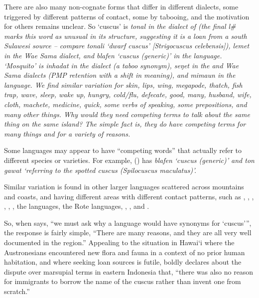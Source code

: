 There are also many non-cognate forms that differ in different
dialects, some triggered by different patterns of contact,
some by tabooing, and the motivation for others remains unclear.
So ‘cuscus’ is \it{tonal} in the  dialect of  (the
final \it{l{\#}} marks this word as unusual in its structure,
suggesting it is a loan from a south Sulawesi source -- compare
 \it{tonali} ‘dwarf cuscus’ [\it{Strigocuscus celebensis}]),
\it{lemet} in the Wae Sama dialect,
and \it{blafen} ‘cuscus (generic)’
in the  language.
‘Mosquito’ is \it{inhadat} in the  dialect (a taboo synonym),
\it{seŋet} in the 
and Wae Sama dialects (PMP retention with a shift in meaning),
and \it{mimaun} in the  language.
We find similar variation for skin,
lips, wing, megapode, thatch,
fish trap, wave, sleep, wake up, hungry,
cold/flu, defecate, good, many,
husband, wife, cloth, machete,
medicine, quick, some verbs of speaking,
some prepositions, and many other things.
Why would they need competing terms to talk about the same thing
on the same island? The simple fact is,
they do have competing terms for many things
and for a variety of reasons.

Some languages may appear to have ``competing words'' that actually
refer to different species or varieties.
For example,  () has \it{blafen} ‘cuscus
(generic)’ and \it{ton gawat}
‘referring to the spotted cuscus (\it{Spilocuscus maculatus})’.

Similar variation is found in other larger languages scattered
across mountains and coasts, and having different areas with different contact
patterns, such as , ,
, , , ,
the  languages, the Rote languages,
, , and .

So, when \citet[268]{Blust2012b} says, “we must ask why a language
would have synonyms for ‘cuscus’”,
the response is fairly simple,
“There are many reasons,
and they are all very well documented in the region.” Appealing
to the situation in Hawai‘i where the Austronesians encountered
new flora and fauna in a context of no prior human habitation,
and where seeking loan sources is futile,
\citet[273]{Blust2012b} boldly declares about the dispute over
marsupial terms in eastern Indonesia that,
“there was also no reason for  immigrants to borrow the
name of the cuscus rather than invent one from scratch.”


